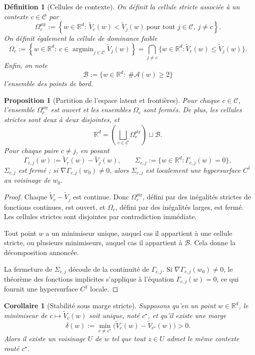 \documentclass[11pt,a4paper]{article}
\newtheorem{definition}{Définition}[section]
\newtheorem{proposition}{Proposition}[section]
\newtheorem{corollary}{Corollaire}[section]
\DeclareMathOperator{\argmin}{argmin}
\newcommand{\R}{\mathbb R}
\newcommand{\Ccal}{\mathcal C}
\newcommand{\Acal}{\mathcal A}
\newcommand{\Bcal}{\mathcal B}
\begin{document}
\begin{definition}[Cellules de contexte]
On définit la cellule stricte associée à un contexte \(c\in\Ccal\) par
\[
\Omega_c^{\mathrm{str}}:=\left\{w\in\R^d:\ \widetilde V_c(w)<\widetilde V_j(w)\ \text{pour tout }j\in\Ccal,\ j\neq c\right\}.
\]
On définit également la cellule de dominance faible
\[
\Omega_c:=\left\{w\in\R^d:\ c\in\argmin_{j\in\Ccal}\widetilde V_j(w)\right\}
=
\bigcap_{j\neq c}\{w\in\R^d:\widetilde V_c(w)\le \widetilde V_j(w)\}.
\]
Enfin, on note
\[
\Bcal:=\{w\in\R^d:\ \#\Acal(w)\ge 2\}
\]
l'ensemble des points de bord.
\end{definition}

\begin{proposition}[Partition de l'espace latent et frontières]
Pour chaque \(c\in\Ccal\), l'ensemble \(\Omega_c^{\mathrm{str}}\) est ouvert et les ensembles \(\Omega_c\) sont fermés. De plus, les cellules strictes sont deux à deux disjointes, et
\[
\R^d=\left(\bigsqcup_{c\in\Ccal}\Omega_c^{\mathrm{str}}\right)\sqcup \Bcal.
\]
Pour chaque paire \(c\neq j\), en posant
\[
\Gamma_{c,j}(w):=\widetilde V_c(w)-\widetilde V_j(w),
\qquad
\Sigma_{c,j}:=\{w\in\R^d:\Gamma_{c,j}(w)=0\},
\]
\(\Sigma_{c,j}\) est fermé ; si \(\nabla\Gamma_{c,j}(w_0)\neq 0\), alors \(\Sigma_{c,j}\) est localement une hypersurface \(C^1\) au voisinage de \(w_0\).
\end{proposition}

\begin{proof}
Chaque \(\widetilde V_c-\widetilde V_j\) est continue. Donc \(\Omega_c^{\mathrm{str}}\), défini par des inégalités strictes de fonctions continues, est ouvert, et \(\Omega_c\), défini par des inégalités larges, est fermé. Les cellules strictes sont disjointes par contradiction immédiate.

Tout point \(w\) a un minimiseur unique, auquel cas il appartient à une cellule stricte, ou plusieurs minimiseurs, auquel cas il appartient à \(\Bcal\). Cela donne la décomposition annoncée.

La fermeture de \(\Sigma_{c,j}\) découle de la continuité de \(\Gamma_{c,j}\). Si \(\nabla\Gamma_{c,j}(w_0)\neq 0\), le théorème des fonctions implicites s'applique à l'équation \(\Gamma_{c,j}(w)=0\), ce qui fournit une hypersurface \(C^1\) locale.
\end{proof}

\begin{corollary}[Stabilité sous marge stricte]
Supposons qu'en un point \(w\in\R^d\), le minimiseur de \(c\mapsto \widetilde V_c(w)\) soit unique, noté \(c^\star\), et qu'il existe une marge
\[
\delta(w):=\min_{c\neq c^\star}\bigl(\widetilde V_c(w)-\widetilde V_{c^\star}(w)\bigr)>0.
\]
Alors il existe un voisinage \(U\) de \(w\) tel que tout \(z\in U\) admet le même contexte routé \(c^\star\).
\end{corollary}
\end{document}
